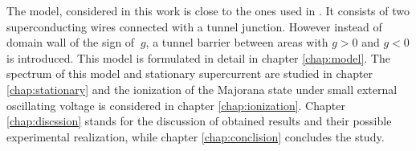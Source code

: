 The model, considered in this work is close to the ones used in \cite{Oreg_2010,Lutchyn_2010}. It consists of two superconducting wires connected with a tunnel junction. However instead of domain wall of the sign of $~g $, a tunnel barrier between areas with $ g>0 $ and $ g<0 $ is introduced. This model is formulated in detail in chapter \ref{chap:model}. The spectrum of this model and stationary supercurrent are studied in chapter \ref{chap:stationary} and the ionization of the Majorana state under small external oscillating voltage is considered in chapter \ref{chap:ionization}. Chapter \ref{chap:discssion}  stands for the discussion of obtained results and their possible experimental realization, while chapter \ref{chap:conclision} concludes the study.


